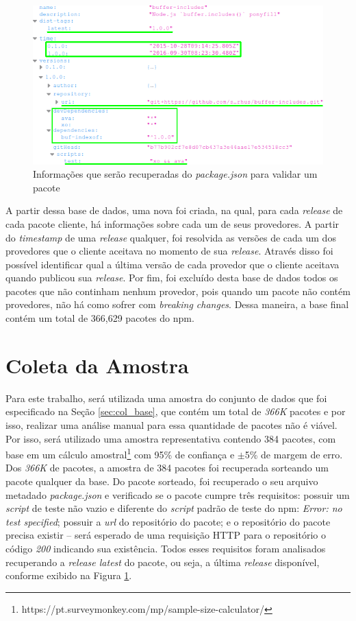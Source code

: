 \begin{figure}
    \centering
    \includegraphics[scale=0.5]{figuras/package_json.png}
    \caption{Informações que serão recuperadas do \textit{package.json} para validar um pacote}
    \label{fig:package_json}
\end{figure}{}

A partir dessa base de dados, uma nova foi criada, na qual, para cada \textit{release} de cada pacote cliente, há informações sobre cada um de seus provedores. A partir do \textit{timestamp} de uma \textit{release} qualquer, foi resolvida as versões de cada um dos provedores que o cliente aceitava no momento de sua \textit{release}. Através disso foi possível identificar qual a última versão de cada provedor que o cliente aceitava quando publicou sua \textit{release}. Por fim, foi excluído desta base de dados todos os pacotes que não continham nenhum provedor, pois quando um pacote não contém provedores, não há como sofrer com \textit{breaking changes}. Dessa maneira, a base final contém um total de 366,629 pacotes do \gls{npm}.

\section{Coleta da Amostra}
\label{sec:col_amostra}
Para este trabalho, será utilizada uma amostra do conjunto de dados que foi especificado na Seção \ref{sec:col_base}, que contém um total de \textit{366K} pacotes e por isso, realizar uma análise manual para essa quantidade de pacotes não é viável. Por isso, será utilizado uma amostra representativa contendo 384 pacotes, com base em um cálculo amostral\footnote{https://pt.surveymonkey.com/mp/sample-size-calculator/} com 95\% de confiança e $\pm$5\% de margem de erro. Dos \textit{366K} de pacotes, a amostra de 384 pacotes foi recuperada sorteando um pacote qualquer da base. Do pacote sorteado, foi recuperado o seu arquivo metadado \textit{package.json} e verificado se o pacote cumpre três requisitos: possuir um \textit{script} de teste não vazio e diferente do \textit{script} padrão de teste do \gls{npm}: \textit{Error: no test specified}; possuir a \textit{url} do repositório do pacote; e o repositório do pacote precisa existir -- será esperado de uma requisição \Gls{HTTP} para o repositório o código \textit{200} indicando sua existência. Todos esses requisitos foram analisados recuperando a \textit{release latest} do pacote, ou seja, a última \textit{release} disponível, conforme exibido na Figura \ref{fig:package_json}.

